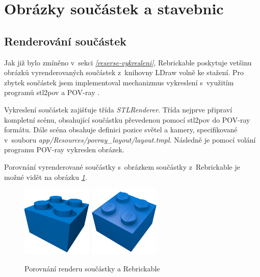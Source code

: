 \section{Obrázky součástek a stavebnic}
\subsection{Renderování součástek}
Jak již bylo zmíněno v~sekci \emph{\ref{reserse-vykresleni}}, Rebrickable poskytuje vetšinu obrázků vyrenderovaných součástek z~knihovny LDraw volně ke stažení. Pro zbytek součástek jsem implementoval mechanizmus vykreslení s~využitím programů stl2pov \autocite{stl2pov} a POV-ray \autocite{povray}.

Vykreslení součástek zajišťuje třída \textit{STLRenderer}. Třída nejprve připraví kompletní scénu, obsahující součástku převedenou pomocí stl2pov do POV-ray formátu. Dále scéna obsahuje definici pozice světel a kamery, specifikované v~souboru \textit{app/Resources/povray\_layout/layout.tmpl}. Následně je pomocí volání programu POV-ray vykreslen obrázek. 

Porovnání vyrenderované součástky s~obrázkem součástky z~Rebrickable je možné vidět na obrázku \emph{\ref{porovnani-render}}.

\begin{figure}[htbp]
    \centering
    \includegraphics[width=0.30\textwidth,height=\textheight,keepaspectratio]{images/povray.png}
    \includegraphics[width=0.30\textwidth,height=\textheight,keepaspectratio]{images/3003.png}
    \caption{Porovnání renderu součástky a Rebrickable \autocite{rebrickable:part:image:3003}\label{porovnani-render}}
\end{figure}



